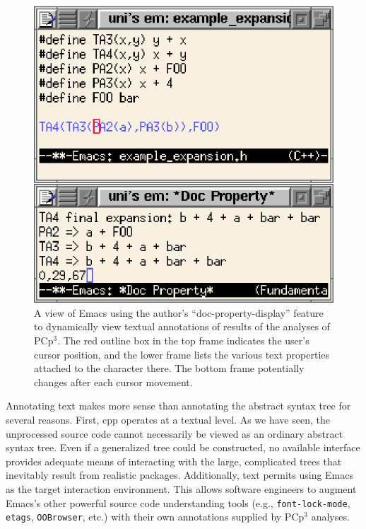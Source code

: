 \documentclass{article}
\newcommand{\pcp}{\mbox{\textsf{PCp}$^3$}}
\newcommand{\Cpp}{\mbox{\textsf{cpp}}}
\newcommand{\eg}{e.g.,}
\newcommand{\etc}{etc}  %
\begin{document}
\begin{figure}[bhtp]
  \begin{center}
    \leavevmode
    \includegraphics{figs/doc-prop.ps}
    \caption{A view of Emacs using the author's ``doc-property-display''
      feature to dynamically view textual annotations of results of the
      analyses of \pcp{}.  The red outline box in the top frame
      indicates the user's cursor position, and the lower frame lists the
      various text properties attached to the character there.
      The bottom frame potentially changes after each cursor movement.}
    \label{fig:emacsdocprop}
  \end{center}
\end{figure}


Annotating text makes more sense than annotating the abstract syntax
tree for several reasons.  First, \Cpp{} operates at a textual level.
As we have seen, the unprocessed source code cannot necessarily be
viewed as an ordinary abstract syntax tree.  Even if a generalized tree
could be constructed, no available interface provides adequate means
of interacting with the large, complicated trees that inevitably result
from realistic packages.
Additionally, text permits using Emacs as the target interaction
environment. This allows software engineers to augment Emacs's other
powerful source code understanding tools (\eg{} \texttt{font-lock-mode},
\texttt{etags}, \texttt{OOBrowser}, \etc{}.)  with their own annotations
supplied by \pcp{} analyses.
\end{document}
